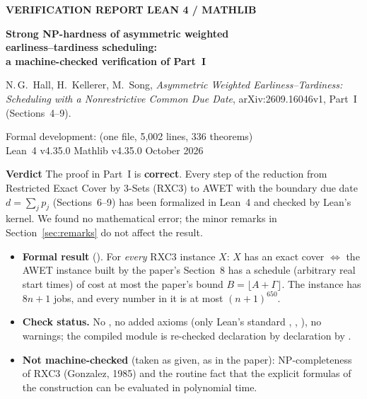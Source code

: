 \documentclass[11pt]{article}
\begin{document}
\thispagestyle{plain}

{\sffamily\bfseries\small\color{accent} VERIFICATION REPORT \;\textperiodcentered\; LEAN 4 / MATHLIB}

\vspace{6pt}
{\raggedright{}
\fontsize{21}{25.5}\selectfont\bfseries Strong NP-hardness of asymmetric weighted\\ earliness--tardiness scheduling:\\ a machine-checked verification of Part~I\par}

\vspace{10pt}
{\raggedright\large N.\,G.~Hall, H.~Kellerer, M.~Song, \emph{Asymmetric Weighted Earliness--Tardiness: Scheduling with a Nonrestrictive Common Due Date}, arXiv:2609.16046v1, Part~I (Sections~4--9).\par}

\vspace{8pt}
{\raggedright\small\color{muted} Formal development:  (one file, 5{,}002 lines, 336 theorems)\\
Lean~4 v4.35.0 \;\textperiodcentered\; Mathlib v4.35.0 \;\textperiodcentered\; October 2026\par}

\vspace{8pt}
\begin{tcolorbox}[enhanced,colback=accentsoft,frame hidden,borderline west={3pt}{0pt}{accent},arc=0pt,outer arc=0pt,left=10pt,right=10pt,top=8pt,bottom=8pt]
{\sffamily\bfseries\color{accent} Verdict}\quad
The proof in Part~I is \textbf{correct}. Every step of the reduction from
Restricted Exact Cover by 3-Sets (RXC3) to AWET with the boundary due date $d=\sum_j p_j$
(Sections~6--9) has been formalized in Lean~4 and checked by Lean's kernel. We found no
mathematical error; the minor remarks in Section~\ref{sec:remarks} do not affect the result.

\smallskip
\begin{itemize}[leftmargin=14pt,itemsep=3pt,before=\raggedright]
\item \textbf{Formal result} (). For \emph{every} RXC3 instance $X$:
  $X$ has an exact cover $\iff$ the AWET instance built by the paper's Section~8 has a schedule
  (arbitrary real start times) of cost at most the paper's bound $B=\lfloor A+\Gamma\rfloor$.
  The instance has $8n+1$ jobs, and every number in it is at most $(n+1)^{650}$.
\item \textbf{Check status.} No , no added axioms (only Lean's standard
  , , ), no warnings; the compiled module
  is re-checked declaration by declaration by .
\item \textbf{Not machine-checked} (taken as given, as in the paper): NP-completeness of RXC3
  (Gonzalez, 1985) and the routine fact that the explicit formulas of the construction can be
  evaluated in polynomial time.
\end{itemize}
\end{tcolorbox}
\end{document}
